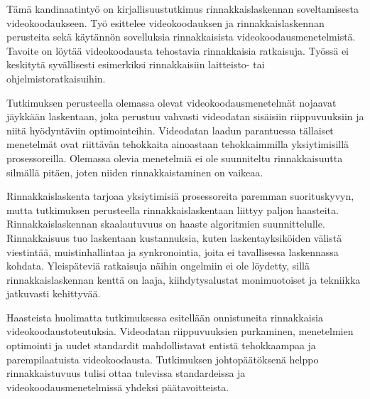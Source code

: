 \begin{fiabstract}

Tämä kandinaatintyö on kirjallisuustutkimus rinnakkaislaskennan soveltamisesta
videokoodaukseen. Työ esittelee videokoodauksen ja rinnakkaislaskennan
perusteita sekä käytännön sovelluksia rinnakkaisista videokoodausmenetelmistä.
Tavoite on löytää videokoodausta tehostavia rinnakkaisia ratkaisuja. Työssä
ei keskitytä syvällisesti esimerkiksi rinnakkaisiin laitteisto- tai
ohjelmistoratkaisuihin.

Tutkimuksen perusteella olemassa olevat videokoodausmenetelmät nojaavat
jäykkään laskentaan, joka perustuu vahvasti videodatan sisäisiin riippuvuuksiin
ja niitä hyödyntäviin optimointeihin. Videodatan laadun parantuessa tällaiset
menetelmät ovat riittävän tehokkaita ainoastaan tehokkaimmilla yksiytimisillä
prosessoreilla. Olemassa olevia menetelmiä ei ole suunniteltu rinnakkaisuutta
silmällä pitäen, joten niiden rinnakkaistaminen on vaikeaa.

Rinnakkaislaskenta tarjoaa yksiytimisiä prosessoreita paremman suorituskyvyn,
mutta tutkimuksen perusteella rinnakkaislaskentaan liittyy paljon haasteita.
Rinnakkaislaskennan skaalautuvuus on haaste algoritmien suunnittelulle.
Rinnakkaisuus tuo laskentaan kustannuksia, kuten laskentayksiköiden välistä
viestintää, muistinhallintaa ja synkronointia, joita ei tavallisessa
laskennassa kohdata. Yleispäteviä ratkaisuja näihin ongelmiin ei ole löydetty,
sillä rinnakkaislaskennan kenttä on laaja, kiihdytysalustat monimuotoiset ja
tekniikka jatkuvasti kehittyvää.

Haasteista huolimatta tutkimuksessa esitellään onnistuneita rinnakkaisia
videokoodaustoteutuksia. Videodatan riippuvuuksien purkaminen, menetelmien
optimointi ja uudet standardit mahdollistavat entistä tehokkaampaa ja
parempilaatuista videokoodausta. Tutkimuksen johtopäätöksenä helppo 
rinnakkaistuvuus tulisi ottaa tulevissa standardeissa ja
videokoodausmenetelmissä yhdeksi päätavoitteista.

\begin{comment}
Tämä kandinaatintyö käsittelee videokoodausmenetelmien rinnakkaislaskennallisia
toteutuksia. Työn tavoitteena on osoittaa, että rinnakkaislaskentaa
hyödyntämällä voidaan toteuttaa perinteisiä menetelmiä tehokkaampaa videon
pakkaamista ja purkamista rinnakkaisohjelmoinnin ongelmista huolimatta.
Käsittely keskittyy rinnakkaislaskennasta saatavaan
laskentatehon kasvuun eikä esimerkiksi rinnakkaisen laskennan oikeellisuuteen
tai sen järjestämiseen. Videokoodausmenetelmiä käsitellään hyvin yleisellä
tasolla menemättä yksittäisten standardien toteutuksiin tarkemmin.


\end{comment}
\end{fiabstract}

